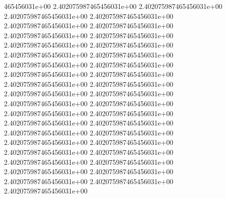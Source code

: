 465456031e+00	2.402075987465456031e+00	2.402075987465456031e+00	2.402075987465456031e+00	2.402075987465456031e+00	2.402075987465456031e+00	2.402075987465456031e+00	2.402075987465456031e+00	2.402075987465456031e+00	2.402075987465456031e+00	2.402075987465456031e+00	2.402075987465456031e+00	2.402075987465456031e+00	2.402075987465456031e+00	2.402075987465456031e+00	2.402075987465456031e+00	2.402075987465456031e+00	2.402075987465456031e+00	2.402075987465456031e+00	2.402075987465456031e+00	2.402075987465456031e+00	2.402075987465456031e+00	2.402075987465456031e+00	2.402075987465456031e+00	2.402075987465456031e+00	2.402075987465456031e+00	2.402075987465456031e+00	2.402075987465456031e+00	2.402075987465456031e+00	2.402075987465456031e+00	2.402075987465456031e+00	2.402075987465456031e+00	2.402075987465456031e+00	2.402075987465456031e+00	2.402075987465456031e+00	2.402075987465456031e+00	2.402075987465456031e+00	2.402075987465456031e+00	2.402075987465456031e+00	2.402075987465456031e+00

